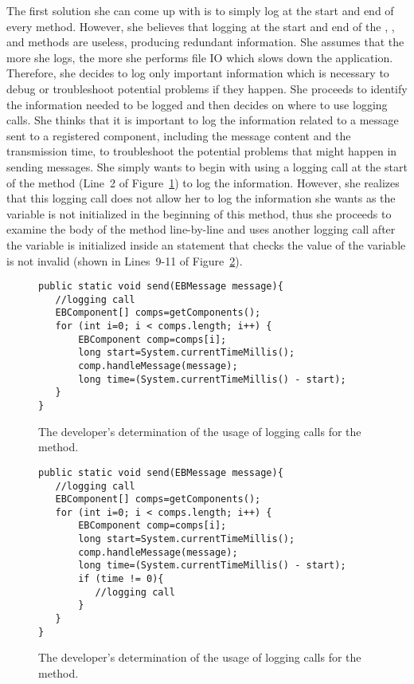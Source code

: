 The first solution she can come up with is to simply log at the start and end of every method. However, she believes that logging at the start and end of the , , and  methods are useless, producing redundant information. She assumes that the more she logs, the more she performs file IO which slows down the application. Therefore, she decides to log only important information which is necessary to debug or troubleshoot potential problems if they happen. She proceeds to identify the information needed to be logged and then decides on where to use logging calls. She thinks that it is important to log the information related to a message sent to a registered component, including the message content and the transmission time, to troubleshoot the potential problems that might happen in sending messages. She simply wants to begin with using a logging call at the start of the  method (Line~2 of Figure~\ref{ch2-ex-logged-m1}) to log the information. However, she realizes that this logging call does not allow her to log the information she wants as the  variable is not initialized in the beginning of this method, thus she proceeds to examine the body of the  method line-by-line and uses another logging call after the  variable is initialized inside an  statement that checks the value of the variable  is not invalid (shown in Lines~9-11 of Figure~\ref{ch2-ex-logged-m2}). 

\begin{figure}[H]
\def\baselinestretch{1}
\begin{lstlisting}
public static void send(EBMessage message){
   //logging call
   EBComponent[] comps=getComponents();
   for (int i=0; i < comps.length; i++) {
       EBComponent comp=comps[i];
       long start=System.currentTimeMillis();
       comp.handleMessage(message);
       long time=(System.currentTimeMillis() - start);
   }
}
\end{lstlisting}
\caption{The developer’s determination of the usage of logging calls for the  method.\label{ch2-ex-logged-m1}}
\end{figure}

\begin{figure}[H]
\def\baselinestretch{1}
\begin{lstlisting}
public static void send(EBMessage message){
   //logging call
   EBComponent[] comps=getComponents();
   for (int i=0; i < comps.length; i++) {
       EBComponent comp=comps[i];
       long start=System.currentTimeMillis();
       comp.handleMessage(message);
       long time=(System.currentTimeMillis() - start);
       if (time != 0){
          //logging call
       }
   }
}
\end{lstlisting}
\caption{The developer’s determination of the usage of logging calls for the  method.\label{ch2-ex-logged-m2}}
\end{figure}

